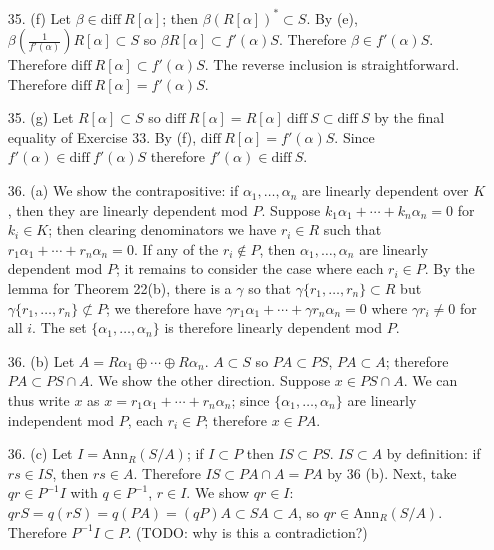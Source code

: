 \documentclass{article}
\newcommand{\diff}[1]{\text{diff}\ #1}
\begin{document}
\begin{enumerate}
\item[35. (f)] Let $\beta \in \diff R[\alpha]$; then $\beta (R[\alpha])^{*} \subset S$.  By (e), $\beta(\frac{1}{f'(\alpha)})R[\alpha] \subset S$ so $\beta R[\alpha] \subset f'(\alpha)S$.  Therefore $\beta \in f'(\alpha)S$.  Therefore $\diff R[\alpha] \subset f'(\alpha)S$.  The reverse inclusion is straightforward.  Therefore $\diff R[\alpha] = f'(\alpha)S$.

\item[35. (g)] Let $R[\alpha] \subset S$ so $\diff R[\alpha] = R[\alpha]\ \diff S \subset \diff S$ by the final equality of Exercise 33.  By (f), $\diff R[\alpha] = f'(\alpha) S$.  Since $f'(\alpha) \in \diff f'(\alpha)S$ therefore $f'(\alpha)\in \diff S$.

\item[36. (a)] We show the contrapositive: if $\alpha_1, \ldots, \alpha_{n}$ are linearly dependent over $K$, then they are linearly dependent mod $P$.  Suppose $k_1 \alpha_1 + \cdots + k_n \alpha_n = 0$ for $k_i \in K$; then clearing denominators we have $r_i \in R$ such that $r_1 \alpha_1 + \cdots + r_n \alpha_n = 0$.  If any of the $r_i \not \in P$, then $\alpha_1, \ldots, \alpha_n$ are linearly dependent mod $P$; it remains to consider the case where each $r_i \in P$.  By the lemma for Theorem 22(b), there is a $\gamma$ so that $\gamma\{r_1, \ldots, r_n\} \subset R$ but $\gamma\{r_1, \ldots, r_n\} \not\subset P$; we therefore have $\gamma r_1 \alpha_1 + \cdots + \gamma r_n \alpha_n = 0$ where $\gamma r_i \neq 0$ for all $i$.  The set $\{\alpha_1, \ldots, \alpha_n\}$ is therefore linearly dependent mod $P$.

\item[36. (b)] Let $A = R\alpha_1 \oplus \cdots \oplus R\alpha_n$.  $A \subset S$ so $PA \subset PS$, $PA \subset A$; therefore $PA \subset PS \cap A$.  We show the other direction.   Suppose $x \in PS \cap A$.  We can thus write $x$ as $x = r_1 \alpha_1 + \cdots + r_n \alpha_n$; since $\{\alpha_1, \ldots, \alpha_n\}$ are linearly independent mod $P$, each $r_i \in P$; therefore $x \in PA$.

\item[36. (c)] Let $I = \text{Ann}_{R}(S/A)$; if $I \subset P$ then $IS \subset PS$.  $IS \subset A$ by definition: if $rs \in IS$, then $rs \in A$.  Therefore $IS \subset PA \cap A = PA$ by 36 (b).  Next, take $qr \in P^{-1}I$ with $q \in P^{-1}$, $r \in I$.  We show $qr \in I$: $qrS = q(rS) = q(PA) = (qP)A \subset SA \subset A$, so $qr \in \text{Ann}_{R}(S/A)$.  Therefore $P^{-1}I \subset P$.  (TODO: why is this a contradiction?)


\end{enumerate}
\end{document}
